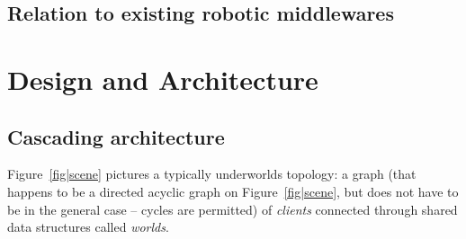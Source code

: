 \documentclass[letterpaper, 10 pt, conference]{ieeeconf}  %
\newcommand{\uwds}{{\sc underworlds}\xspace}
\begin{document}
\subsection{Relation to existing robotic middlewares}

\section{Design and Architecture}

\subsection{Cascading architecture}

Figure~\ref{fig|scene} pictures a typically \uwds topology: a graph (that
happens to be a directed acyclic graph on Figure~\ref{fig|scene}, but does not
have to be in the general case -- cycles are permitted) of \emph{clients}
connected through shared data structures called \emph{worlds}.
\end{document}

